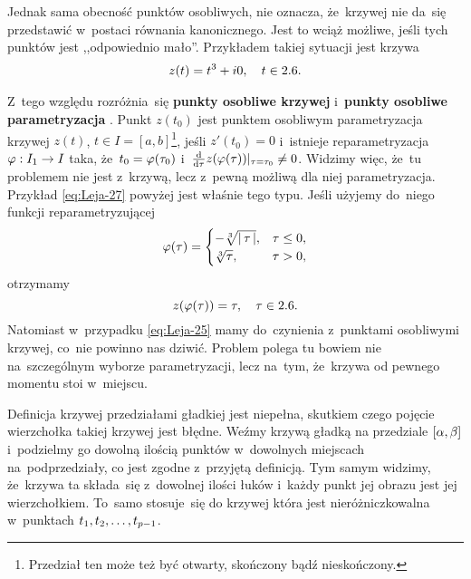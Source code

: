 \documentclass[a4paper,11pt]{article}
\begin{document}
Jednak sama obecność punktów osobliwych, nie oznacza, że~krzywej nie
da~się przedstawić w~postaci równania kanonicznego. Jest to wciąż
możliwe, jeśli tych punktów jest ,,odpowiednio mało''. Przykładem
takiej sytuacji jest krzywa
\begin{equation}
  \label{eq:Leja-30}
  \begin{split}
    z( t ) = t^{ 3 } + i 0, \quad t \in 2.6.
  \end{split}
\end{equation}

Z~tego względu rozróżnia~się \textbf{punkty osobliwe krzywej}
i~\textbf{punkty osobliwe parametryzacja}
\cite{GdowskiElementGeometriiRozniczkowejZZadaniami1999}. Punkt
$z( t_{ 0 } )$ jest punktem osobliwym parametryzacja krzywej $z( t )$,
$t \in I = [ a, b ]$\footnote{Przedział ten może też być otwarty,
  skończony bądź nieskończony.}, jeśli $z'( t_{ 0 } ) = 0$ i~istnieje
reparametryzacja $\varphi: I_{ 1 } \to I$ taka,
że~$t_{ 0 } = \varphi( \tau_{ 0 } )$
i~$\tfrac{ \mathrm{d} }{ \mathrm{d} \tau } z( \varphi( \tau ) )|_{ \tau = \tau_{ 0 }
} \neq 0$. Widzimy więc, że~tu problemem nie jest z~krzywą, lecz
z~pewną możliwą dla niej parametryzacja. Przykład \eqref{eq:Leja-27}
powyżej jest właśnie tego typu. Jeśli użyjemy do~niego funkcji
reparametryzującej
\begin{equation}
  \label{eq:Leja-31}
  \varphi( \tau ) =
  \begin{cases}
    -\sqrt[3]{ \left| \,  \tau  \, \right| }, & \tau \leq 0, \\
    \sqrt[3]{ \tau }, & \tau > 0,
  \end{cases}
\end{equation}
otrzymamy
\begin{equation}
  \label{eq:Leja-32}
  z( \varphi( \tau ) ) = \tau, \quad \tau \in 2.6.
\end{equation}
Natomiast w~przypadku \eqref{eq:Leja-25} mamy do~czynienia z~punktami
osobliwymi krzywej, co~nie powinno nas dziwić. Problem polega tu
bowiem nie na~szczególnym wyborze parametryzacji, lecz na~tym,
że~krzywa od pewnego momentu stoi w~miejscu.

\vspace{\spaceFour}


\start {} Definicja krzywej przedziałami gładkiej jest
niepełna, skutkiem czego pojęcie wierzchołka takiej krzywej jest
błędne. Weźmy krzywą gładką na przedziale $[ \alpha, \beta ]$ i~podzielmy
go dowolną ilością punktów w~dowolnych miejscach na~podprzedziały, co
jest zgodne z~przyjętą definicją. Tym samym widzimy, że~krzywa ta
składa~się z~dowolnej ilości łuków i~każdy punkt jej obrazu jest jej
wierzchołkiem. To~samo stosuje~się do krzywej która jest
nieróżniczkowalna w~punktach $t_{ 1 }, t_{ 2 }, \ldots, t_{ p - 1 }$.
\end{document}
